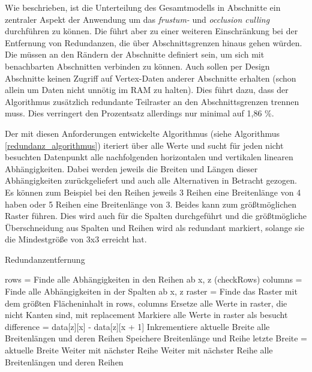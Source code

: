Wie beschrieben, ist die Unterteilung des Gesamtmodells in Abschnitte ein zentraler Aspekt der Anwendung um das \textit{frustum-} und \textit{occlusion culling} durchführen zu können. Die führt aber zu einer weiteren Einschränkung bei der Entfernung von Redundanzen, die über Abschnittsgrenzen hinaus gehen würden. Die müssen an den Rändern der Abschnitte definiert sein, um sich mit benachbarten Abschnitten verbinden zu können. Auch sollen per Design Abschnitte keinen Zugriff auf Vertex-Daten anderer Abschnitte erhalten (schon allein um Daten nicht unnötig im RAM zu halten). Dies führt dazu, dass der Algorithmus zusätzlich redundante Teilraster an den Abschnittsgrenzen trennen muss. Dies verringert den Prozentsatz allerdings nur minimal auf 1,86 \%.

Der mit diesen Anforderungen entwickelte Algorithmus (siehe Algorithmus \ref{redundanz_algorithmus}) iteriert über alle Werte und sucht für jeden nicht besuchten Datenpunkt alle nachfolgenden horizontalen und vertikalen linearen Abhängigkeiten. Dabei werden jeweils die Breiten und Längen dieser Abhängigkeiten zurückgeliefert und auch alle Alternativen in Betracht gezogen. Es können zum Beispiel bei den Reihen jeweils 3 Reihen eine Breitenlänge von 4 haben oder 5 Reihen eine Breitenlänge von 3. Beides kann zum größtmöglichen Raster führen. Dies wird auch für die Spalten durchgeführt und die größtmögliche Überschneidung aus Spalten und Reihen wird als redundant markiert, solange sie die Mindestgröße von 3x3 erreicht hat.

\begin{algorithm}[H]
\begin{algorithmic}
\caption{Redundanzentfernung}
\label{redundanz_algorithmus}
            \State rows = Finde alle Abhängigkeiten in den Reihen ab x, z (checkRows)
            \State columns = Finde alle Abhängigkeiten in der Spalten ab x, z
            \State raster = Finde das Raster mit dem größten Flächeninhalt in rows, columns
                \State Ersetze alle Werte in raster, die nicht Kanten sind, mit replacement
                \State Markiere alle Werte in raster als besucht
            \EndIf
        \EndIf     
    \EndFor
\EndProcedure
{}
        \State difference = data[z][x] - data[z][x + 1]
                \State Inkrementiere aktuelle Breite
                \State\Return alle Breitenlängen und deren Reihen
                \State Speichere Breitenlänge und Reihe
                \State letzte Breite = aktuelle Breite
                \State Weiter mit nächster Reihe
            \Else
                \State Weiter mit nächster Reihe
            \EndIf
        \EndFor
    \EndFor
    \State\Return alle Breitenlängen und deren Reihen
\EndProcedure
\end{algorithmic}
\end{algorithm}